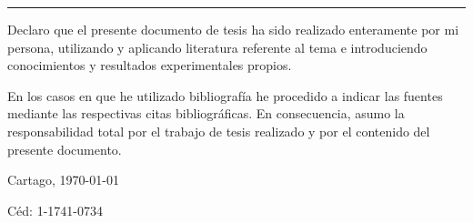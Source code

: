 \thispagestyle{empty}

\rule{10mm}{0pt}

\vfill

Declaro que el presente documento de tesis ha sido realizado enteramente
por mi persona, utilizando y aplicando literatura referente al tema e
introduciendo conocimientos y resultados experimentales propios.

En los casos en que he utilizado bibliografía he procedido a indicar las
fuentes mediante las respectivas citas bibliográficas.  En consecuencia,
asumo la responsabilidad total por el trabajo de tesis realizado y por
el contenido del presente documento.

\vspace*{8mm}

\begin{flushright}
  \thesisAuthor\par
  Cartago, \today\par
  Céd: 1-1741-0734
\end{flushright}

\cleardoublepage

